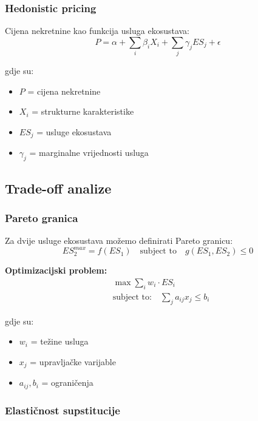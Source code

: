 \documentclass[11pt,oneside]{book}
\begin{document}
\subsubsection{Hedonistic pricing}

Cijena nekretnine kao funkcija usluga ekosustava:
\begin{equation}
	P = \alpha + \sum_{i} \beta_i X_i + \sum_{j} \gamma_j ES_j + \epsilon
\end{equation}

gdje su:
\begin{itemize}
	\item $P$ = cijena nekretnine
	\item $X_i$ = strukturne karakteristike
	\item $ES_j$ = usluge ekosustava
	\item $\gamma_j$ = marginalne vrijednosti usluga
\end{itemize}

\subsection{Trade-off analize}

\subsubsection{Pareto granica}

Za dvije usluge ekosustava možemo definirati Pareto granicu:
\begin{equation}
	ES_2^{max} = f(ES_1) \quad \text{subject to} \quad g(ES_1, ES_2) \leq 0
\end{equation}

\textbf{Optimizacijski problem:}
\begin{align}
	&\max \sum_{i} w_i \cdot ES_i\\
	&\text{subject to:} \quad \sum_{j} a_{ij} x_j \leq b_i
\end{align}

gdje su:
\begin{itemize}
	\item $w_i$ = težine usluga
	\item $x_j$ = upravljačke varijable
	\item $a_{ij}, b_i$ = ograničenja
\end{itemize}

\subsubsection{Elastičnost supstitucije}
\end{document}
